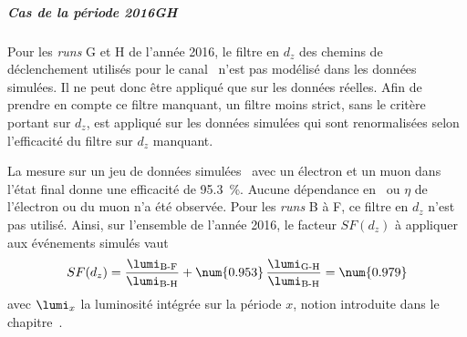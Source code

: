 \subparagraph{Cas de la période 2016GH}
Pour les \emph{runs} G et H de l'année 2016, le filtre en $d_z$ des chemins de déclenchement utilisés pour le canal \ele\mu\ n'est pas modélisé dans les données simulées.
Il ne peut donc être appliqué que sur les données réelles.
Afin de prendre en compte ce filtre manquant, un filtre moins strict, sans le critère portant sur $d_z$, est appliqué sur les données simulées qui sont renormalisées selon l'efficacité du filtre sur $d_z$ manquant.
\par
La mesure sur un jeu de données simulées \ttbar\ avec un électron et un muon dans l'état final donne une efficacité de \SI{95.3}{\%}.
Aucune dépendance en \pT\ ou $\eta$ de l'électron ou du muon n'a été observée.
Pour les \emph{runs} B à F, ce filtre en $d_z$ n'est pas utilisé.
Ainsi, sur l'ensemble de l'année 2016, le facteur $SF(d_z)$ à appliquer aux événements simulés vaut
\begin{equation}
SF(d_z) = \frac{\lumi_\text{B-F}}{\lumi_\text{B-H}} + \num{0.953}\,\frac{\lumi_\text{G-H}}{\lumi_\text{B-H}} = \num{0.979}
\end{equation}
avec $\lumi_x$ la luminosité intégrée sur la période $x$, notion introduite dans le chapitre~.

